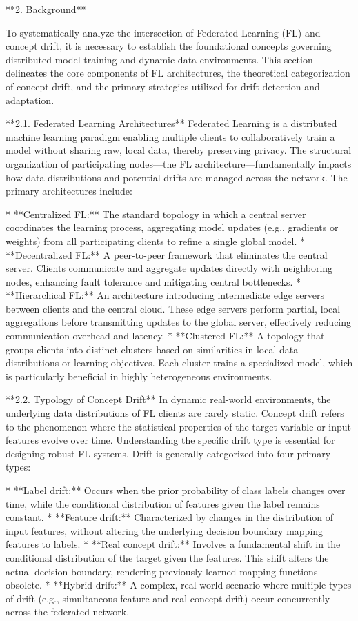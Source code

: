 \documentclass[journal]{IEEEtran}
\begin{document}
**2. Background**

To systematically analyze the intersection of Federated Learning (FL) and concept drift, it is necessary to establish the foundational concepts governing distributed model training and dynamic data environments. This section delineates the core components of FL architectures, the theoretical categorization of concept drift, and the primary strategies utilized for drift detection and adaptation.

**2.1. Federated Learning Architectures**
Federated Learning is a distributed machine learning paradigm enabling multiple clients to collaboratively train a model without sharing raw, local data, thereby preserving privacy. The structural organization of participating nodes—the FL architecture—fundamentally impacts how data distributions and potential drifts are managed across the network. The primary architectures include:

*   **Centralized FL:** The standard topology in which a central server coordinates the learning process, aggregating model updates (e.g., gradients or weights) from all participating clients to refine a single global model.
*   **Decentralized FL:** A peer-to-peer framework that eliminates the central server. Clients communicate and aggregate updates directly with neighboring nodes, enhancing fault tolerance and mitigating central bottlenecks.
*   **Hierarchical FL:** An architecture introducing intermediate edge servers between clients and the central cloud. These edge servers perform partial, local aggregations before transmitting updates to the global server, effectively reducing communication overhead and latency.
*   **Clustered FL:** A topology that groups clients into distinct clusters based on similarities in local data distributions or learning objectives. Each cluster trains a specialized model, which is particularly beneficial in highly heterogeneous environments.

**2.2. Typology of Concept Drift**
In dynamic real-world environments, the underlying data distributions of FL clients are rarely static. Concept drift refers to the phenomenon where the statistical properties of the target variable or input features evolve over time. Understanding the specific drift type is essential for designing robust FL systems. Drift is generally categorized into four primary types:

*   **Label drift:** Occurs when the prior probability of class labels changes over time, while the conditional distribution of features given the label remains constant.
*   **Feature drift:** Characterized by changes in the distribution of input features, without altering the underlying decision boundary mapping features to labels.
*   **Real concept drift:** Involves a fundamental shift in the conditional distribution of the target given the features. This shift alters the actual decision boundary, rendering previously learned mapping functions obsolete.
*   **Hybrid drift:** A complex, real-world scenario where multiple types of drift (e.g., simultaneous feature and real concept drift) occur concurrently across the federated network.
\end{document}
